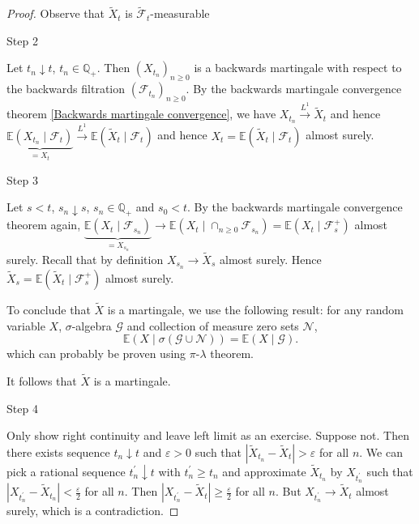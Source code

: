 \documentclass[parskip=full]{article}
\theoremstyle{definition}
\newcommand{\Q}{\mathbb{Q}}
\newcommand{\1}{\mathbbm{1}}
\newcommand{\E}{\mathbb{E}}
\begin{document}
\begin{proof}
Observe that $\tilde{X}_t$ is $\tilde{\mathcal{F}}_t$-measurable 

Step 2

Let $t_n \downarrow t$, $t_n \in \Q_+$. Then $(X_{t_n})_{n \geq 0}$ is a backwards martingale with respect to the backwards filtration $(\mathcal{F}_{t_n})_{n \geq 0}$. By the backwards martingale convergence theorem \ref{Backwards martingale convergence}, we have $X_{t_n} \xrightarrow{L^1} \tilde{X}_t$ and hence $\underbrace{\E (X_{t_n}  \mid \mathcal{F}_t)}_{=X_t} \xrightarrow{L^1} \E(\tilde{X}_t \mid \mathcal{F}_t)$ and hence $X_t = \E(\tilde{X}_t \mid \mathcal{F}_t)$ almost surely.

Step 3

Let $s < t$, $s_n \downarrow s$, $s_n \in \Q_+$ and $s_0 < t$. By the backwards martingale convergence theorem again, $\underbrace{\E (X_{t} \mid \mathcal{F}_{s_n})}_{=X_{s_n}} \to \E (X_t \mid \cap_{n \geq 0} \mathcal{F}_{s_n}) = \E (X_t \mid \mathcal{F}_{s}^+)$ almost surely. Recall that by definition $X_{s_n} \to \tilde{X}_s$ almost surely. Hence $\tilde{X}_s = \E(\tilde{X}_t \mid \mathcal{F}_s^+)$ almost surely.

To conclude that $\tilde{X}$ is a martingale, we use the following result: for any random variable $X$, $\sigma$-algebra $\mathcal{G}$ and collection of measure zero sets $\mathcal{N}$,
\[
  \E(X \mid \sigma(\mathcal{G} \cup \mathcal{N})) = \E(X \mid \mathcal{G}).
\]
which can probably be proven using $\pi$-$\lambda$ theorem.

It follows that $\tilde{X}$ is a martingale.

Step 4

Only show right continuity and leave left limit as an exercise. Suppose not. Then there exists sequence $t_n \downarrow t$ and $\varepsilon > 0$ such that $|\tilde{X}_{t_n} - \tilde{X}_t| > \varepsilon$ for all $n$. We can pick a rational sequence $t_n^\prime \downarrow t$ with $t_n^\prime \geq t_n$ and approximate $\tilde{X}_{t_n}$ by $X_{t_n^\prime}$ such that $|X_{t_n^\prime} - \tilde{X}_{t_n}| < \frac{\varepsilon}{2}$ for all $n$. Then $|X_{t_n^\prime} - \tilde{X}_t| \geq \frac{\varepsilon}{2}$ for all $n$. But $X_{t_n^\prime} \to \tilde{X}_t$ almost surely, which is a contradiction.
\end{proof}
\end{document}
